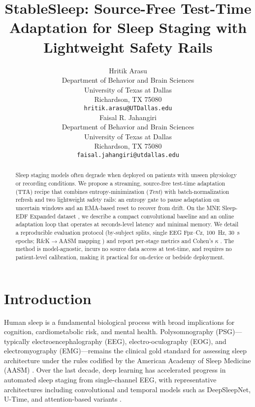 \documentclass{article}
\title{StableSleep: Source-Free Test-Time Adaptation for Sleep Staging with Lightweight Safety Rails}
\author{
  Hritik Arasu \\
  Department of Behavior and Brain Sciences\\
  University of Texas at Dallas\\
  Richardson, TX 75080 \\
  \texttt{hritik.arasu@UTDallas.edu} \\
  \And
  Faisal R. Jahangiri \\
  Department of Behavior and Brain Sciences\\
  University of Texas at Dallas\\
  Richardson, TX 75080 \\
  \texttt{faisal.jahangiri@utdallas.edu} \\
}
\begin{document}
\maketitle


\begin{abstract}
Sleep staging models often degrade when deployed on patients with unseen physiology or recording conditions. We propose a streaming, source-free test-time adaptation (TTA) recipe that combines entropy-minimization (\emph{Tent}) with batch-normalization refresh and two lightweight safety rails: an entropy gate to pause adaptation on uncertain windows and an EMA-based reset to recover from drift. On the MNE Sleep-EDF Expanded dataset \citep{kemp2013sleepedf,sleepedfx2018,goldberger2000physionet}, we describe a compact convolutional baseline and an online adaptation loop that operates at seconds-level latency and minimal memory. We detail a reproducible evaluation protocol (by-subject splits, single EEG Fpz--Cz, 100~Hz, 30~s epochs; R\&K$\rightarrow$AASM mapping \citep{berry2015aasm,berry2012aasmresp}) and report per-stage metrics and Cohen's $\kappa$ \citep{cohen1960kappa}. The method is model-agnostic, incurs no source data access at test-time, and requires no patient-level calibration, making it practical for on-device or bedside deployment.
\end{abstract}


\section{Introduction}

Human sleep is a fundamental biological process with broad implications for cognition, cardiometabolic risk, and mental health. Polysomnography (PSG)---typically electroencephalography (EEG), electro-oculography (EOG), and electromyography (EMG)---remains the clinical gold standard for assessing sleep architecture under the rules codified by the American Academy of Sleep Medicine (AASM) \citep{aasm2015manual}. Over the last decade, deep learning has accelerated progress in automated sleep staging from single-channel EEG, with representative architectures including convolutional and temporal models such as DeepSleepNet, U-Time, and attention-based variants \citep{supratak2017deepsleepnet,perslev2019utime,eldele2021attnsleep}.
\end{document}
